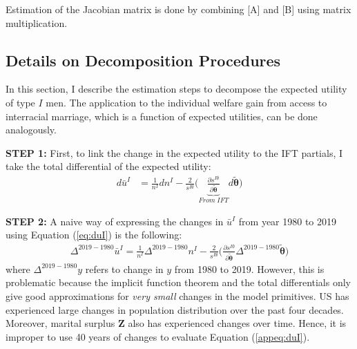 \begin{landscape}
\vspace{5mm}
Estimation of the Jacobian matrix is done by combining  {\color{blue} [A]} and {\color{blue} [B]} using matrix multiplication.  

\end{landscape}


\subsection{Details on Decomposition Procedures} \label{appsec:decompdetails}

In this section, I describe the estimation steps to decompose the expected utility of type $I$ men. The application to the individual welfare gain from access to interracial marriage, which is a function of expected utilities, can be done analogously. 

\vspace{3mm}
\noindent\textbf{STEP 1:} First, to link the change in the expected utility to the IFT partials, I take the total differential of the expected utility:
\begin{align}
	d\bar{u}^I &= \frac{1}{n^I}dn^I -  \frac{2}{s^{I\emptyset}} \Big(  \underbrace{\frac{\partial s^{I\emptyset} }{\partial \tilde{\boldsymbol{\theta}}}}_{From \; IFT} d \tilde{\boldsymbol{\theta}}  \Big) \label{appeq:duI}
\end{align}


\noindent\textbf{STEP 2:} A naive way of expressing the changes in $\bar{u}^I$ from year 1980 to 2019 using Equation (\ref{eq:duI}) is the following:
\begin{align*}
	\Delta^{2019-1980} \bar{u}^I = \frac{1}{n^I} \Delta^{2019-1980} n^I -  \frac{2}{s^{I\emptyset}} \Big(  \frac{\partial s^{I\emptyset} }{\partial \tilde{\boldsymbol{\theta}}} \Delta^{2019-1980} \tilde{\boldsymbol{\theta}}  \Big)
\end{align*}
where $\Delta^{2019-1980} y$ refers to change in $y$ from 1980 to 2019. However, this is problematic because the implicit function theorem and the total differentials only give good approximations for \textit{very small} changes in the model primitives. US has experienced large changes in population distribution over the past four decades. Moreover, marital surplus $\mathbf{Z}$ also has experienced changes over time. Hence, it is improper to use 40 years of changes to evaluate Equation (\ref{appeq:duI}). 


